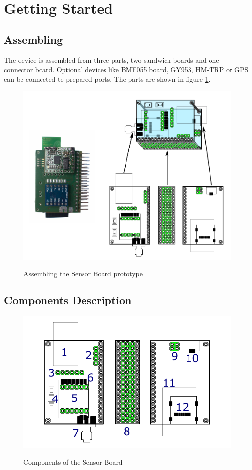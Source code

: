 \section{Getting Started}

\subsection{Assembling}
The device is assembled from three parts, two sandwich boards and one connector board. Optional devices like BMF055 board, GY953, HM-TRP or GPS can be connected to prepared ports. The parts are shown in figure \ref{HWassembling}.

\begin{figure}[H]
	\centering
	\includegraphics[scale=1]{img/assemblingHW.pdf}
	\label{HWassembling}
	\caption{Assembling the Sensor Board prototype}
\end{figure}

\subsection{Components Description}

\begin{figure}[H]
	\centering
	\includegraphics[scale=1]{img/componentsDescription.pdf}
	\label{HWcomponents}
	\caption{Components of the Sensor Board}
\end{figure}

